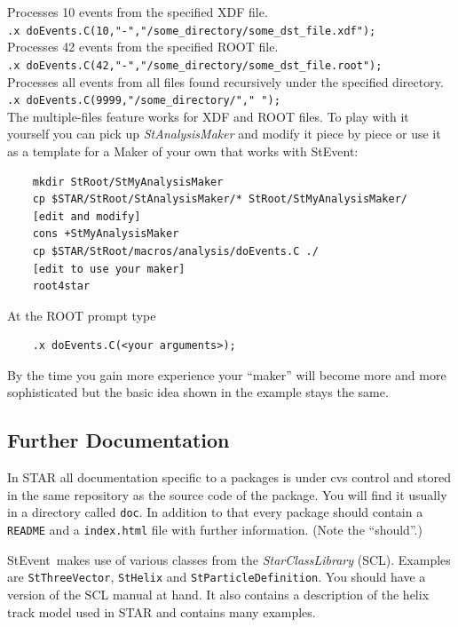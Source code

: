 \documentclass[twoside]{article}
\newcommand{\name}[1]{\textsl{#1}}%
\newcommand{\StEvent}{\textsf{StEvent}}
\begin{document}
Processes 10 events from the specified XDF file.\\
\hspace{1cm}\verb+.x doEvents.C(10,"-","/some_directory/some_dst_file.xdf");+\\

Processes 42 events from the specified ROOT file.\\
\hspace{1cm}\verb+.x doEvents.C(42,"-","/some_directory/some_dst_file.root");+\\

Processes all events from all files found recursively under the
specified directory.\\
\verb+.x doEvents.C(9999,"/some_directory/"," ");+\\

The multiple-files feature works for XDF and ROOT files.  To play with
it yourself you can pick up \name{StAnalysisMaker} and modify it piece
by piece or use it as a template for a Maker of your own that works
with \StEvent:

\begin{verbatim}
    mkdir StRoot/StMyAnalysisMaker
    cp $STAR/StRoot/StAnalysisMaker/* StRoot/StMyAnalysisMaker/
    [edit and modify]
    cons +StMyAnalysisMaker
    cp $STAR/StRoot/macros/analysis/doEvents.C ./
    [edit to use your maker]
    root4star
\end{verbatim}
At the ROOT prompt type
\begin{verbatim}
    .x doEvents.C(<your arguments>);
\end{verbatim}
By the time you gain more experience your ``maker'' will become more
and more sophisticated but the basic idea shown in the example stays
the same.

\subsection{Further Documentation}
\label{sec:furtherDoc}

In STAR all documentation specific to a packages is under cvs control
and stored in the same repository as the source code of the package.
You will find it usually in a directory called \texttt{doc}.  In
addition to that every package should contain a \texttt{README} and a
\texttt{index.html} file with further information. (Note the
``should''.)

\StEvent\ makes use of various classes from the
\name{StarClassLibrary} (SCL).  Examples are \texttt{StThreeVector},
\texttt{StHelix} and \texttt{StParticleDefinition}. You should have a
version of the SCL manual at hand. It also contains a description of
the helix track model used in STAR and contains many
examples. 
\end{document}
